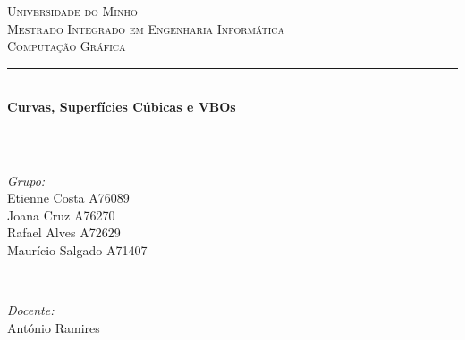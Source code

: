 \documentclass[12pt]{article}
\begin{document}
\begin{titlepage}

\newcommand{\HRule}{\rule{\linewidth}{0.5mm}} %

\center %
    

\textsc{\LARGE Universidade do Minho}\\[1.5cm] 
\textsc{\Large Mestrado Integrado em Engenharia Informática}\\[0.5cm] 
\textsc{\large Computação Gráfica}\\[0.5cm]


\HRule \\[0.4cm]
{ \huge \bfseries Curvas, Superfícies Cúbicas e VBOs}\\[0.4cm] 
\HRule \\[1.5cm]
    

\begin{minipage}{0.4\textwidth}
\begin{flushleft} \large
\emph{Grupo:}\\
Etienne Costa A76089 \\
Joana Cruz A76270 \\
Rafael Alves A72629 \\
Maurício Salgado A71407 \\
\end{flushleft}
\end{minipage}
~
\begin{minipage}{0.4\textwidth}
\begin{flushright} \large
\emph{Docente:} \\
António Ramires\\
\end{flushright}
\end{minipage}\\[2cm]


\end{titlepage}
\end{document}
